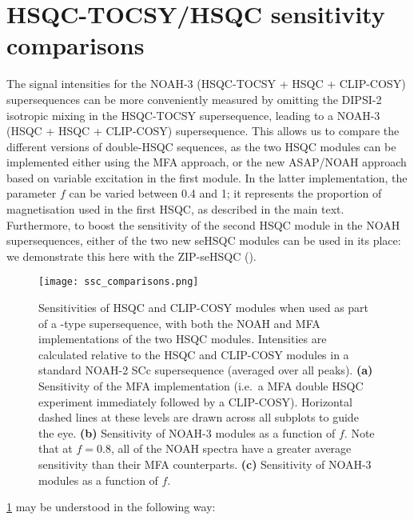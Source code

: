 \section{HSQC-TOCSY/HSQC sensitivity comparisons}

The signal intensities for the NOAH-3  (HSQC-TOCSY + HSQC + CLIP-COSY) supersequences can be more conveniently measured by omitting the DIPSI-2 isotropic mixing in the HSQC-TOCSY supersequence, leading to a NOAH-3  (HSQC + HSQC + CLIP-COSY) supersequence.
This allows us to compare the different versions of double-HSQC sequences, as the two HSQC modules can be implemented either using the MFA approach, or the new ASAP/NOAH approach based on variable excitation in the first module.
In the latter implementation, the parameter $f$ can be varied between 0.4 and 1; it represents the proportion of  magnetisation used in the first HSQC, as described in the main text.
Furthermore, to boost the sensitivity of the second HSQC module in the NOAH supersequences, either of the two new seHSQC modules can be used in its place: we demonstrate this here with the ZIP-seHSQC (\noahSpb{}).

\begin{figure}
    \centering
    \texttt{[image: ssc\_comparisons.png]}
    \caption{
        Sensitivities of HSQC and CLIP-COSY modules when used as part of a -type supersequence, with both the NOAH and MFA implementations of the two HSQC modules.
        Intensities are calculated relative to the HSQC and CLIP-COSY modules in a standard NOAH-2 SCc supersequence (averaged over all peaks).
        \textbf{(a)} Sensitivity of the MFA implementation (i.e.\ a MFA double HSQC experiment immediately followed by a CLIP-COSY).
        Horizontal dashed lines at these levels are drawn across all subplots to guide the eye.
        \textbf{(b)} Sensitivity of NOAH-3  modules as a function of $f$.
        Note that at $f = 0.8$, all of the NOAH spectra have a greater average sensitivity than their MFA counterparts.
        \textbf{(c)} Sensitivity of NOAH-3  modules as a function of $f$.
        \andro{}
    }
    \label{fig:ssc_comparisons}
\end{figure}

\cref{fig:ssc_comparisons} may be understood in the following way:

